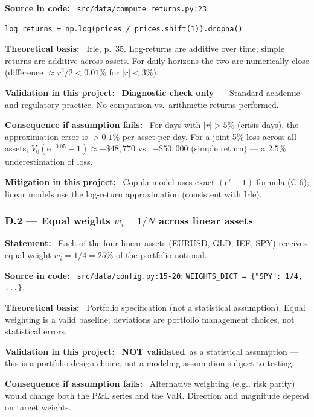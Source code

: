 \documentclass[11pt,a4paper]{article}
\newcommand{\asmfield}[1]{\medskip\noindent\textbf{#1:}\ }
\newcommand{\code}[1]{\texttt{#1}}
\newcommand{\diagnostic}{\textbf{Diagnostic check only}}
\newcommand{\notvalidated}{\textbf{NOT validated}}
\begin{document}
\asmfield{Source in code}
\code{src/data/compute\_returns.py:23}:
\begin{lstlisting}
log_returns = np.log(prices / prices.shift(1)).dropna()
\end{lstlisting}

\asmfield{Theoretical basis}
Irle, p.~35. Log-returns are additive over time; simple returns are additive
across assets. For daily horizons the two are numerically close (difference
$\approx r^2/2 < 0.01\%$ for $|r| < 3\%$).

\asmfield{Validation in this project}
\diagnostic\ --- Standard academic and regulatory practice. No comparison
vs.\ arithmetic returns performed.

\asmfield{Consequence if assumption fails}
For days with $|r| > 5\%$ (crisis days), the approximation error is $> 0.1\%$
per asset per day. For a joint 5\% loss across all assets,
$V_0 (\mathrm{e}^{-0.05} - 1) \approx -\$48{,}770$ vs.\ $-\$50{,}000$
(simple return) --- a $2.5\%$ underestimation of loss.

\asmfield{Mitigation in this project}
Copula model uses exact $(\mathrm{e}^r - 1)$ formula (C.6); linear models
use the log-return approximation (consistent with Irle).

\subsubsection{D.2 --- Equal weights $w_i = 1/N$ across linear assets}\label{asm:D2}

\asmfield{Statement}
Each of the four linear assets (EURUSD, GLD, IEF, SPY) receives equal
weight $w_i = 1/4 = 25\%$ of the portfolio notional.

\asmfield{Source in code}
\code{src/data/config.py:15-20}: \lstinline|WEIGHTS_DICT = {"SPY": 1/4, ...}|.

\asmfield{Theoretical basis}
Portfolio specification (not a statistical assumption). Equal weighting
is a valid baseline; deviations are portfolio management choices, not
statistical errors.

\asmfield{Validation in this project}
\notvalidated\ as a statistical assumption --- this is a portfolio
design choice, not a modeling assumption subject to testing.

\asmfield{Consequence if assumption fails}
Alternative weighting (e.g., risk parity) would change both the P\&L
series and the VaR. Direction and magnitude depend on target weights.
\end{document}
